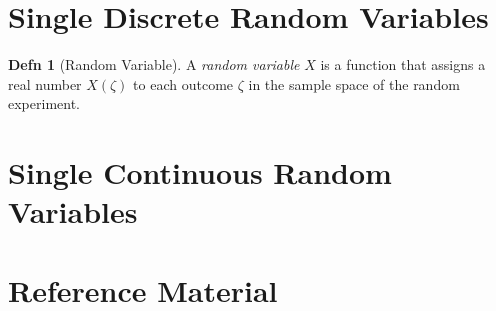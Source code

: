 \documentclass[10pt,letterpaper,final,twoside,notitlepage]{article}
\theoremstyle{plain}
\theoremstyle{definition}
\newtheorem{definition}{Defn}
\begin{document}
\section{Single Discrete Random Variables} \label{sec:Single Discrete Random Variables}
	\begin{definition}[Random Variable]
		A \emph{random variable} $X$ is a function that assigns a real number $X \left( \zeta \right)$ to each outcome $\zeta$ in the sample space of the random experiment.
	\end{definition}
\section{Single Continuous Random Variables} \label{sec:Single Continuous Random Variables}



\appendix
{}

\section{Reference Material} \label{sec:Reference Material}


\end{document}
